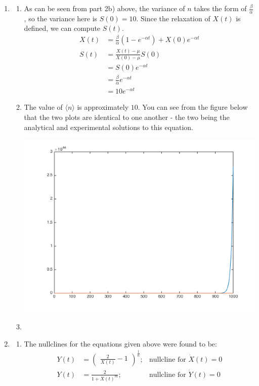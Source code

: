 \documentclass[10pt]{article}
\begin{document}
\begin{enumerate}
\begin{enumerate}
\end{enumerate}
\clearpage
\item
\begin{enumerate}
\item As can be seen from part 2b) above, the variance of $n$ takes the form of $\frac{\beta}{\alpha}$, so the variance here is $S(0) = 10$. Since the relaxation of $X(t)$ is defined, we can compute $S(t)$.
\begin{align*}
X(t) &= \frac{\beta}{\alpha}(1-e^{-\alpha t}) + X(0)e^{-\alpha t} \\
S(t) &= \frac{X(t) - \mu}{X(0) - \mu} S(0) \\
&= S(0)e^{-\alpha t} \\
&= \frac{\beta}{\alpha}e^{-\alpha t} \\
&= 10 e^{-\alpha t}
\end{align*}
\item The value of $\langle n \rangle$ is approximately $10$. You can see from the figure below that the two plots are identical to one another - the two being the analytical and experimental solutions to this equation.
\begin{center} \includegraphics[scale=0.4]{sbe3hw13q2b.png} \end{center}
\item
\end{enumerate}
\item
\begin{enumerate}
\item The nullclines for the equations given above were found to be: \begin{align*} Y(t) &= \begin{pmatrix} \frac{2}{X(t)} - 1 \end{pmatrix}^{\frac{1}{n}} ;& \text{nullcline for } \dot{X}(t) = 0 \\ Y(t) &= \frac{2}{1+ X(t)^m} ;& \text{nullcline for } \dot{Y}(t) = 0 \end{align*}

\end{enumerate}
\end{enumerate}
\end{document}
